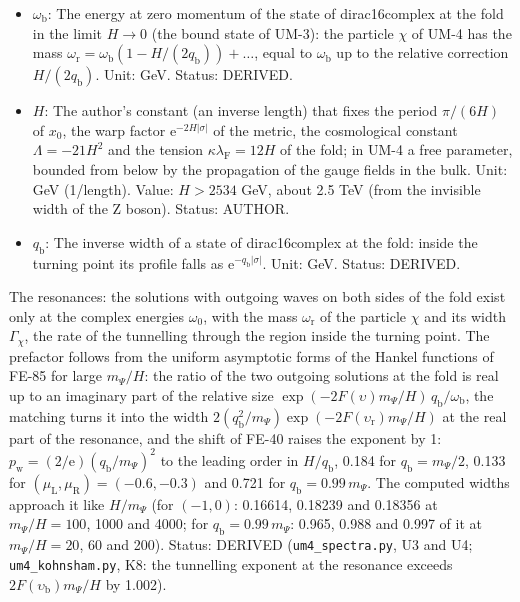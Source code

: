 \documentclass[
  10pt,
]{article}
\begin{document}
\begin{itemize}
  bulk mass \(m_\Psi\);
  \(\upsilon_{\mathrm{b}} = \omega_{\mathrm{b}}/m_\Psi\) that of the
  particle \(\chi\) in the limit \(H/q_{\mathrm{b}} \to 0\),
  \(\upsilon_{\mathrm{r}} = \omega_{\mathrm{r}}/m_\Psi\) that of the
  real part of its resonance. Unit: dimensionless. Status: DERIVED.
\item
  \(\omega_{\mathrm{b}}\): The energy at zero momentum of the state of
  dirac16complex at the fold in the limit \(H \to 0\) (the bound state
  of UM-3): the particle \(\chi\) of UM-4 has the mass
  \(\omega_{\mathrm{r}} = \omega_{\mathrm{b}}(1 - H/(2q_{\mathrm{b}})) + \dots\),
  equal to \(\omega_{\mathrm{b}}\) up to the relative correction
  \(H/(2q_{\mathrm{b}})\). Unit: GeV. Status: DERIVED.
\item
  \(H\): The author's constant (an inverse length) that fixes the period
  \(\pi/(6H)\) of \(x_0\), the warp factor
  \(\mathrm{e}^{-2H\lvert\sigma\rvert}\) of the metric, the cosmological
  constant \(\Lambda = -21H^2\) and the tension
  \(\kappa\lambda_{\mathrm{F}} = 12H\) of the fold; in UM-4 a free
  parameter, bounded from below by the propagation of the gauge fields
  in the bulk. Unit: GeV (1/length). Value: \(H > 2534\) GeV, about 2.5
  TeV (from the invisible width of the Z boson). Status: AUTHOR.
\item
  \(q_{\mathrm{b}}\): The inverse width of a state of dirac16complex at
  the fold: inside the turning point its profile falls as
  \(\mathrm{e}^{-q_{\mathrm{b}}\lvert\sigma\rvert}\). Unit: GeV. Status:
  DERIVED.
\end{itemize}

The resonances: the solutions with outgoing waves on both sides of the
fold exist only at the complex energies \(\omega_0\), with the mass
\(\omega_{\mathrm{r}}\) of the particle \(\chi\) and its width
\(\Gamma_\chi\), the rate of the tunnelling through the region inside
the turning point. The prefactor follows from the uniform asymptotic
forms of the Hankel functions of FE-85 for large \(m_\Psi/H\): the ratio
of the two outgoing solutions at the fold is real up to an imaginary
part of the relative size
\(\exp(-2F(\upsilon)m_\Psi/H)\,q_{\mathrm{b}}/\omega_{\mathrm{b}}\), the
matching turns it into the width
\(2(q_{\mathrm{b}}^2/m_\Psi)\exp(-2F(\upsilon_{\mathrm{r}})m_\Psi/H)\)
at the real part of the resonance, and the shift of FE-40 raises the
exponent by 1:
\(p_{\mathrm{w}} = (2/\mathrm{e})(q_{\mathrm{b}}/m_\Psi)^2\) to the
leading order in \(H/q_{\mathrm{b}}\), 0.184 for
\(q_{\mathrm{b}} = m_\Psi/2\), 0.133 for
\((\mu_{\mathrm{L}}, \mu_{\mathrm{R}}) = (-0.6, -0.3)\) and 0.721 for
\(q_{\mathrm{b}} = 0.99\,m_\Psi\). The computed widths approach it like
\(H/m_\Psi\) (for \((-1, 0)\): 0.16614, 0.18239 and 0.18356 at
\(m_\Psi/H = 100\), 1000 and 4000; for
\(q_{\mathrm{b}} = 0.99\,m_\Psi\): 0.965, 0.988 and 0.997 of it at
\(m_\Psi/H = 20\), 60 and 200). Status: DERIVED
(\texttt{um4\_spectra.py}, U3 and U4; \texttt{um4\_kohnsham.py}, K8: the
tunnelling exponent at the resonance exceeds
\(2F(\upsilon_{\mathrm{b}})m_\Psi/H\) by 1.002).
\end{document}
